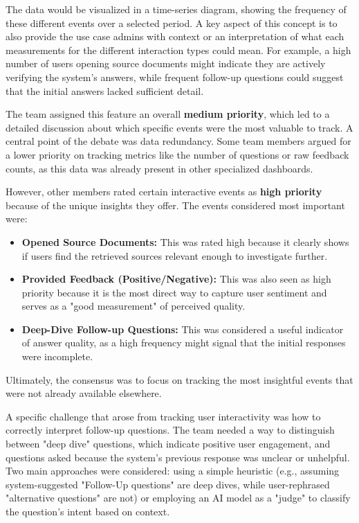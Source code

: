 \documentclass[
	english,
	ruledheaders=section,%
	class=report,%
	thesis={type=bachelor},%
	accentcolor=1b,%
	custommargins=true,%
	marginpar=false,%
	parskip=half-,%
	fontsize=11pt,%
	DIV=14,
]{tudapub}
\begin{document}
The data would be visualized in a time-series diagram, showing the frequency of these different events over a selected period. A key aspect of this concept is to also provide the use case admins with context or an interpretation of what each measurements for the different interaction types could mean. For example, a high number of users opening source documents might indicate they are actively verifying the system's answers, while frequent follow-up questions could suggest that the initial answers lacked sufficient detail.

The team assigned this feature an overall \textbf{medium priority}, which led to a detailed discussion about which specific events were the most valuable to track. A central point of the debate was data redundancy. Some team members argued for a lower priority on tracking metrics like the number of questions or raw feedback counts, as this data was already present in other specialized dashboards.

However, other members rated certain interactive events as \textbf{high priority} because of the unique insights they offer. The events considered most important were:
\begin{itemize}
    \item \textbf{Opened Source Documents:} This was rated high because it clearly shows if users find the retrieved sources relevant enough to investigate further.
    \item \textbf{Provided Feedback (Positive/Negative):} This was also seen as high priority because it is the most direct way to capture user sentiment and serves as a "good measurement" of perceived quality.
    \item \textbf{Deep-Dive Follow-up Questions:} This was considered a useful indicator of answer quality, as a high frequency might signal that the initial responses were incomplete.
\end{itemize}
Ultimately, the consensus was to focus on tracking the most insightful events that were not already available elsewhere.

A specific challenge that arose from tracking user interactivity was how to correctly interpret follow-up questions. The team needed a way to distinguish between "deep dive" questions, which indicate positive user engagement, and questions asked because the system's previous response was unclear or unhelpful. Two main approaches were considered: using a simple heuristic (e.g., assuming system-suggested "Follow-Up questions" are deep dives, while user-rephrased "alternative questions" are not) or employing an AI model as a "judge" to classify the question's intent based on context.
\end{document}
